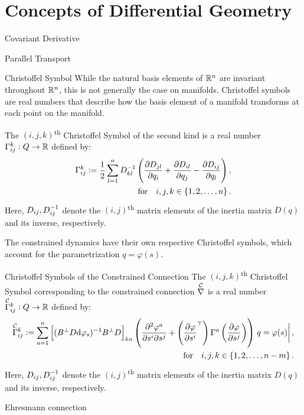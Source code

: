 \documentclass[main.tex]{subfiles}
\begin{document}
\section{Concepts of Differential Geometry}
\begin{boxdef}{Covariant Derivative}
    
\end{boxdef}
\begin{boxdef}{Parallel Transport}
    
\end{boxdef}
\begin{boxdef}{Christoffel Symbol}\label{eq:christoffel}
While the natural basis elements of $\mathbb{R}^n$ are invariant throughout $\mathbb{R}^n$, this is not generally the case on manifolds.
Christoffel symbols are real numbers that describe how the basis element of a manifold transforms at each point on the manifold. 

The $(i,j,k)$\textsuperscript{th} Christoffel Symbol of the second kind is a real number $\Gamma^k_{ij}:Q\to\mathbb{R}$ defined by:
\begin{align}
   \Gamma^k_{ij}:=\frac{1}{2}\sum_{l=1}^n D\inv_{kl}\del{\pdv{D_{jl}}{q_i}+\pdv{D_{il}}{q_j}-\pdv{D_{ij}}{q_l}},\\\qq{for} i,j,k\in\cbr{1,2,\ldots,n}. 
\end{align}
Here, $D_{ij},D^{-1}_{ij}$ denote the $(i,j)$\textsuperscript{th} matrix elements of the inertia matrix $D(q)$ and its inverse, respectively.
\end{boxdef}

The constrained dynamics have their own respective Christoffel symbols, which account for the parametrization $q=\varphi(s)$.
\begin{boxdef}{Christoffel Symbols of the Constrained Connection}\label{eq:christoffelconstrained}
The $(i,j,k)$\textsuperscript{th} Christoffel Symbol corresponding to the constrained connection $\nablac$ is a real number $\Gammac{k}{ij}:Q\to\ree$ defined by:
\begin{align}
   \Gammac{k}{ij}:=\sum^n_{a=1}
   \sbr{(B^\bot D\dd\varphi_s)\inv B^\bot D}_{ka}
   \del{\pdv{\varphi^a}{s^i}{s^j}+\del{\pdv{\varphi}{s^i}^\top}\Gamma^a\del{\pdv{\varphi}{s^j}}}\eval{q=\varphi(s)}
   ,\\\qq{for} i,j,k\in\cbr{1,2,\ldots,n-m}. 
\end{align}
Here, $D_{ij},D^{-1}_{ij}$ denote the $(i,j)$\textsuperscript{th} matrix elements of the inertia matrix $D(q)$ and its inverse, respectively.
\end{boxdef}
\begin{boxdef}{Ehresmann connection}\label{def:ehresmann}
    
\end{boxdef}
\end{document}
